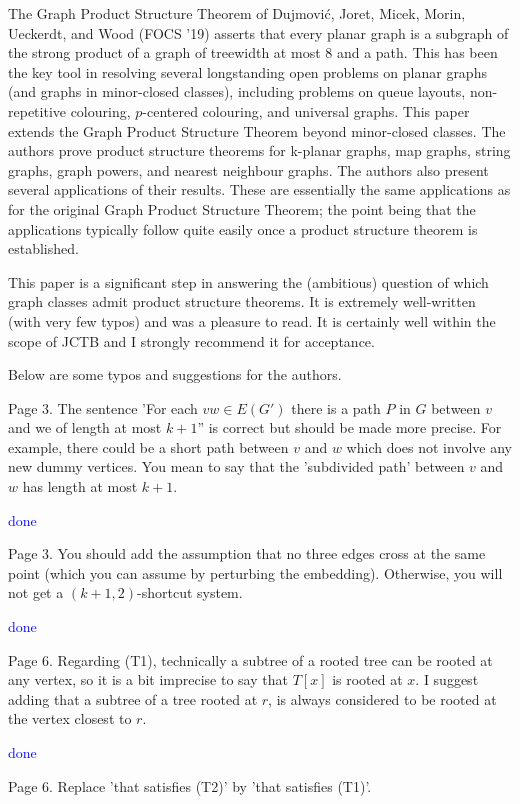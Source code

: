 \documentclass[12pt]{article}
\newcommand{\done}{\textcolor{blue}{done}}
\begin{document}
The Graph Product Structure Theorem of Dujmović, Joret,
Micek, Morin, Ueckerdt, and Wood (FOCS '19) asserts that every planar
graph is a subgraph of the strong product of a graph of treewidth at
most 8 and a path.  This has been the key tool in resolving several
longstanding open problems on planar graphs (and graphs in
minor-closed classes), including problems on queue layouts,
non-repetitive colouring, $p$-centered colouring, and universal graphs.
This paper extends the Graph Product Structure Theorem beyond
minor-closed classes.  The authors prove product structure theorems
for k-planar graphs, map graphs, string graphs, graph powers, and
nearest neighbour graphs.   The authors also present several
applications of their results.  These are essentially the same
applications as for the original Graph Product Structure Theorem; the
point being that the applications typically follow quite easily once a
product structure theorem is established.

This paper is a significant step in answering the (ambitious) question
of which graph classes admit product structure theorems. It is
extremely well-written (with very few typos) and was a pleasure to
read.  It is certainly well within the scope of JCTB and I strongly
recommend it for acceptance.

Below are some typos and suggestions for the authors.

Page 3.  The sentence 'For each $vw \in E(G')$ there is a path $P$ in $G$
between $v$ and we of length at most $k+1$'' is correct but should be made
more precise.  For example, there could be a short path between $v$ and
$w$ which does not involve any new dummy vertices.  You mean to say that
the 'subdivided path' between $v$ and $w$ has length at most $k+1$.

\done

Page 3.  You should add the assumption that no three edges cross at
the same point (which you can assume by perturbing the embedding).
Otherwise, you will not get a $(k+1, 2)$-shortcut system.

\done

Page 6. Regarding (T1), technically a subtree of a rooted tree can be
rooted at any vertex, so it is a bit imprecise to say that $T[x]$ is
rooted at $x$.  I suggest adding that a subtree of a tree rooted at $r$,
is always considered to be rooted at the vertex closest to $r$.

\done

Page 6. Replace 'that satisfies (T2)' by 'that satisfies (T1)'.
\end{document}
